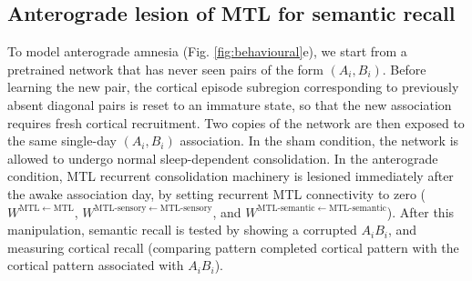 \documentclass{article}
\begin{document}
\subsection*{Anterograde lesion of MTL for semantic recall}
To model anterograde amnesia (Fig. \ref{fig:behavioural}e), we start from a pretrained network that has never seen pairs of the form $(A_i,B_i)$. 
\newline\newline
Before learning the new pair, the cortical episode subregion corresponding to previously absent diagonal pairs is reset to an immature state, so that the new association requires fresh cortical recruitment. Two copies of the network are then exposed to the same single-day $(A_i,B_i)$ association. In the sham condition, the network is allowed to undergo normal sleep-dependent consolidation. In the anterograde condition, MTL recurrent consolidation machinery is lesioned immediately after the awake association day, by setting recurrent MTL connectivity to zero ($W^{\mathrm{MTL}\leftarrow \mathrm{MTL}}$, $W^{\mathrm{MTL\text{-}sensory}\leftarrow \mathrm{MTL\text{-}sensory}}$, and $W^{\mathrm{MTL\text{-}semantic}\leftarrow \mathrm{MTL\text{-}semantic}}$).
\newline\newline
After this manipulation, semantic recall is tested by showing a corrupted $A_iB_i$, and measuring cortical recall (comparing pattern completed cortical pattern with the cortical pattern associated with $A_iB_i$).
\end{document}
